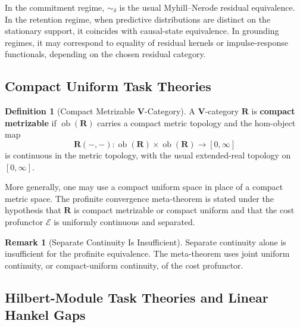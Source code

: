 \documentclass[12pt]{article}
\theoremstyle{definition}
\newtheorem{definition}[theorem]{Definition}
\newtheorem{remark}[theorem]{Remark}
\begin{document}
In the commitment regime, $\sim_\delta$ is the usual Myhill--Nerode residual
equivalence.  In the retention regime, when predictive distributions are
distinct on the stationary support, it coincides with causal-state
equivalence.  In grounding regimes, it may correspond to equality of residual
kernels or impulse-response functionals, depending on the chosen residual
category.

\subsection{Compact Uniform Task Theories}
\label{subsec:compact-uniform}

\begin{definition}[Compact Metrizable $\mathbf V$-Category]
\label{def:compact-metrizable}
A $\mathbf V$-category $\mathbf R$ is \textbf{compact metrizable} if
$\operatorname{ob}(\mathbf R)$ carries a compact metric topology and the
hom-object map
\[
\mathbf R(-,-):
\operatorname{ob}(\mathbf R)\times\operatorname{ob}(\mathbf R)
\to
[0,\infty]
\]
is continuous in the metric topology, with the usual extended-real topology on
$[0,\infty]$.
\end{definition}

More generally, one may use a compact uniform space in place of a compact
metric space.  The profinite convergence meta-theorem is stated under the
hypothesis that $\mathbf R$ is compact metrizable or compact uniform and that
the cost profunctor $\mathcal E$ is uniformly continuous and separated.

\begin{remark}[Separate Continuity Is Insufficient]
\label{rem:separate-continuity-insufficient}
Separate continuity alone is insufficient for the profinite equivalence.  The
meta-theorem uses joint uniform continuity, or compact-uniform continuity, of
the cost profunctor.
\end{remark}

\subsection{Hilbert-Module Task Theories and Linear Hankel Gaps}
\label{subsec:hilbert-module}
\end{document}
